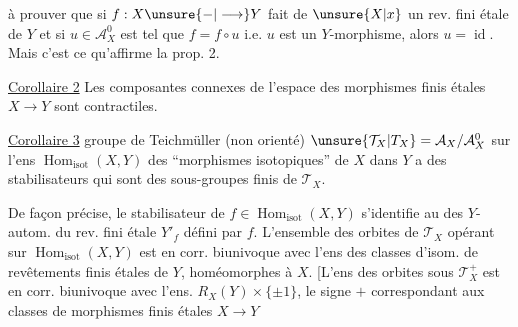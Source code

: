 à prouver que si $f:X\unsure{-|\longrightarrow}Y$ fait de $\unsure{X|x}$ un rev. fini étale de $Y$ et si $u\in\mathcal{A}_X^0$ est tel que $f=f\circ u$ i.e. $u$ est un $Y$-morphisme, alors $u=\operatorname{id}$. Mais c'est ce qu'affirme la prop. 2.

\uline{Corollaire 2} Les composantes connexes de l'espace des morphismes finis étales $X\longrightarrow Y$ sont contractiles.

\uline{Corollaire 3}   groupe de Teichmüller (non orienté) $\unsure{\mathcal{T}_X|T_X}=\mathcal{A}_X/\mathcal{A}_X^0$ sur l'ens $\operatorname{Hom}_{\mathrm{isot}}(X,Y)$ des ``morphismes isotopiques'' de $X$ dans $Y$  a des stabilisateurs qui sont des sous-groupes finis de $\mathcal{T}_X$.

De façon précise, le stabilisateur de $f\in\operatorname{Hom}_{\mathrm{isot}}(X,Y)$ s'identifie au    des $Y$-autom. du rev. fini étale $Y'_f$ défini par $f$. L'ensemble des orbites de $\mathcal{T}_X$ opérant sur $\operatorname{Hom}_{\mathrm{isot}}(X,Y)$ est en corr. biunivoque avec l'ens  des classes d'isom. de revêtements finis étales de $Y$, homéomorphes à $X$.
[L'ens des orbites sous $\mathcal{T}_X^+$ est en corr. biunivoque avec l'ens. $R_X(Y)\times\{\pm1\}$, le signe $+$  correspondant aux classes de morphismes finis étales $X\longrightarrow Y$
